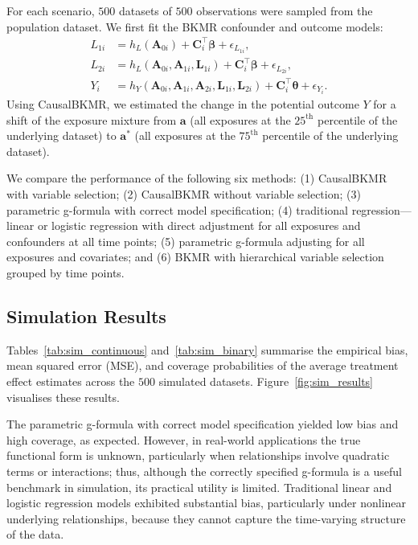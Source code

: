 For each scenario, $500$ datasets of $500$ observations were sampled from the population dataset. We first fit the BKMR confounder and outcome models:
\begin{align}
    L_{1i} &= h_L(\mathbf{A}_{0i}) + \mathbf{C}_i^\top \boldsymbol{\beta} + \epsilon_{L_{1i}}, \label{eq:sim_L1} \\
    L_{2i} &= h_L(\mathbf{A}_{0i}, \mathbf{A}_{1i}, \mathbf{L}_{1i}) + \mathbf{C}_i^\top \boldsymbol{\beta} + \epsilon_{L_{2i}}, \label{eq:sim_L2} \\
    Y_i &= h_Y(\mathbf{A}_{0i}, \mathbf{A}_{1i}, \mathbf{A}_{2i}, \mathbf{L}_{1i}, \mathbf{L}_{2i}) + \mathbf{C}_i^\top \boldsymbol{\theta} + \epsilon_{Y_i}. \label{eq:sim_Y}
\end{align}
Using CausalBKMR, we estimated the change in the potential outcome $Y$ for a shift of the exposure mixture from $\mathbf{a}$ (all exposures at the $25^{\text{th}}$ percentile of the underlying dataset) to $\mathbf{a}^*$ (all exposures at the $75^{\text{th}}$ percentile of the underlying dataset).

We compare the performance of the following six methods: (1) CausalBKMR with variable selection; (2) CausalBKMR without variable selection; (3) parametric g-formula with correct model specification; (4) traditional regression---linear or logistic regression with direct adjustment for all exposures and confounders at all time points; (5) parametric g-formula adjusting for all exposures and covariates; and (6) BKMR with hierarchical variable selection grouped by time points.

\subsection*{Simulation Results}

Tables~\ref{tab:sim_continuous} and~\ref{tab:sim_binary} summarise the empirical bias, mean squared error (MSE), and coverage probabilities of the average treatment effect estimates across the $500$ simulated datasets. Figure~\ref{fig:sim_results} visualises these results.

The parametric g-formula with correct model specification yielded low bias and high coverage, as expected. However, in real-world applications the true functional form is unknown, particularly when relationships involve quadratic terms or interactions; thus, although the correctly specified g-formula is a useful benchmark in simulation, its practical utility is limited. Traditional linear and logistic regression models exhibited substantial bias, particularly under nonlinear underlying relationships, because they cannot capture the time-varying structure of the data.

